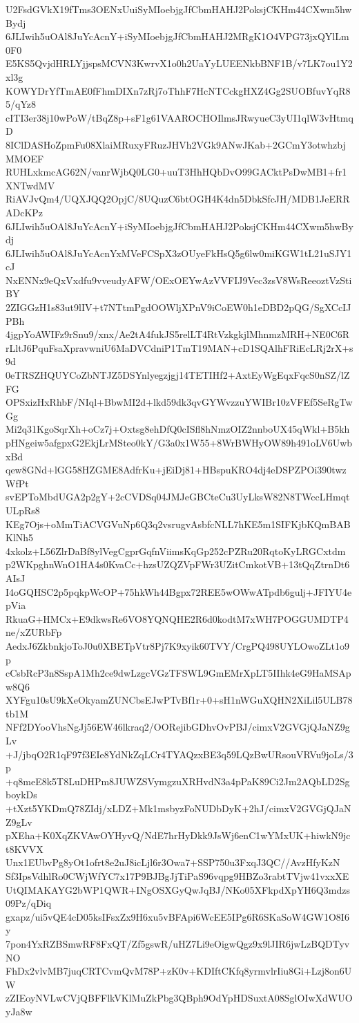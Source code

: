 U2FsdGVkX19fTms3OENxUuiSyMIoebjgJfCbmHAHJ2PoksjCKHm44CXwm5hwBydj
6JLIwih5uOAl8JuYcAcnY+iSyMIoebjgJfCbmHAHJ2MRgK1O4VPG73jxQYlLm0F0
E5KS5QvjdHRLYjjspsMCVN3KwrvX1o0h2UaYyLUEENkbBNF1B/v7LK7ou1Y2xl3g
KOWYDrYfTmAE0fFhmDIXn7zRj7oThhF7HcNTCckgHXZ4Gg2SUOBfuvYqR85/qYz8
cITI3er38j10wPoW/tBqZ8p+sF1g61VAAROCHOIlmsJRwyueC3yUI1qlW3vHtmqD
8IClDASHoZpmFu08XlaiMRuxyFRuzJHVh2VGk9ANwJKab+2GCmY3otwhzbjMMOEF
RUHLxkmcAG62N/vanrWjbQ0LG0+uuT3HhHQbDvO99GACktPsDwMB1+fr1XNTwdMV
RiAVJvQm4/UQXJQQ2OpjC/8UQuzC6btOGH4K4dn5DbkSfcJH/MDB1JeERRADcKPz
6JLIwih5uOAl8JuYcAcnY+iSyMIoebjgJfCbmHAHJ2PoksjCKHm44CXwm5hwBydj
6JLIwih5uOAl8JuYcAcnYxMVeFCSpX3zOUyeFkHsQ5g6lw0miKGW1tL21uSJY1cJ
NxENNx9eQxVxdfu9vveudyAFW/OExOEYwAzVVFIJ9Vec3zsV8WsReeoztVzStiBY
2ZIGGzH1s83ut9lIV+t7NTtmPgdOOWljXPnV9iCoEW0h1eDBD2pQG/SgXCcIJPBh
4jgpYoAWIFz9rSnu9/xnx/Ae2tA4fukJS5relLT4RtVzkgkjlMhnmzMRH+NE0C6R
rLltJ6PquFsaXpravwniU6MaDVCdniP1TmT19MAN+cD1SQAlhFRiEcLRj2rX+s9d
0eTRSZHQUYCoZbNTJZ5DSYnlyegzjgj14TETIHf2+AxtEyWgEqxFqcS0nSZ/lZFG
OPSxizHxRhbF/NIql+BbwMI2d+lkd59dk3qvGYWvzzuYWIBr10zVFEf5SeRgTwGg
Mi2q31KgoSqrXh+oCz7j+Oxtsg8ehDfQ0cISfl8hNmzOIZ2nnboUX45qWkl+B5kh
pHNgeiw5afgpxG2EkjLrMSteo0kY/G3a0x1W55+8WrBWHyOW89h491oLV6UwbxBd
qew8GNd+lGG58HZGME8AdfrKu+jEiDj81+HBspuKRO4dj4eDSPZPOi390twzWfPt
svEPToMbdUGA2p2gY+2cCVDSq04JMJeGBCteCu3UyLksW82N8TWccLHmqtULpRs8
KEg7Ojs+oMmTiACVGVuNp6Q3q2vsrugvAsbfcNLL7hKE5m1SIFKjbKQmBABKlNh5
4xkolz+L56ZlrDaBf8ylVegCgprGqfnViimsKqGp252cPZRu20RqtoKyLRGCxtdm
p2WKpghnWnO1HA4s0KvaCc+hzsUZQZVpFWr3UZitCmkotVB+13tQqZtrnDt6AIsJ
I4oGQHSC2p5pqkpWcOP+75hkWh44Bgpx72REE5wOWwATpdb6gulj+JFIYU4epVia
RkuaG+HMCx+E9dkwsRe6VO8YQNQHE2R6d0kodtM7xWH7POGGUMDTP4ne/xZURbFp
AedxJ6ZkbnkjoToJ0u0XBETpVtr8Pj7K9xyik60TVY/CrgPQ498UYLOwoZLt1o9p
cCsbRcP3n8SspA1Mh2ce9dwLzgcVGzTFSWL9GmEMrXpLT5IIhk4eG9HaMSApw8Q6
XYFgu10sU9kXeOkyamZUNCbsEJwPTvBf1r+0+sH1nWGuXQHN2XiLil5ULB78tb1M
NFf2DYooVhsNgJj56EW46lkraq2/OORejibGDhvOvPBJ/cimxV2GVGjQJaNZ9gLv
+J/jbqO2R1qF97f3EIe8YdNkZqLCr4TYAQzxBE3q59LQzBwURsouVRVu9joLs/3p
+q8meE8k5T8LuDHPm8JUWZSVymgzuXRHvdN3a4pPaK89Ci2Jm2AQbLD2SgboykDs
+tXzt5YKDmQ78ZIdj/xLDZ+Mk1msbyzFoNUDbDyK+2hJ/cimxV2GVGjQJaNZ9gLv
pXEha+K0XqZKVAwOYHyvQ/NdE7hrHyDkk9JsWj6enC1wYMxUK+hiwkN9jct8KVVX
Unx1EUbvPg8yOt1ofrt8e2uJ8icLjl6r3Owa7+SSP750u3FxqJ3QC//AvzHfyKzN
Sf3IpsVdhlRo0CWjWfYC7x17P9BJBgJjTiPaS96vqpg9HBZo3rabtTVjw41vxxXE
UtQIMAKAYG2bWP1QWR+INgOSXGyQwJqBJ/NKo05XFkpdXpYH6Q3mdzs09Pz/qDiq
gxapz/ui5vQE4cD05ksIFsxZx9H6xu5vBFApi6WcEE5IPg6R6SKaSoW4GW1O8I6y
7pon4YxRZBSmwRF8FxQT/Zf5gswR/uHZ7Li9eOigwQgz9x9lJIR6jwLzBQDTyvNO
FhDx2vlvMB7juqCRTCvmQvM78P+zK0v+KDIftCKfq8yrmvlrIiu8Gi+Lzj8on6UW
zZIEoyNVLwCVjQBFFlkVKlMuZkPbg3QBph9OdYpHDSuxtA08SglOIwXdWUOyJa8w
